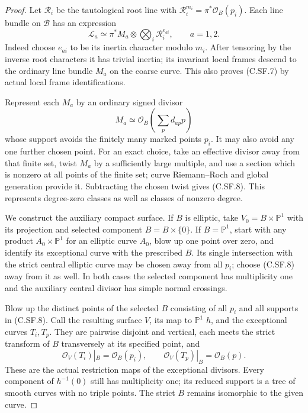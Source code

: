 \begin{proof}
Let $\mathcal R_i$ be the tautological
root line with
$\mathcal R_i^{m_i}=\pi^*\mathcal O_B(p_i)$.
Each line bundle on $\mathcal B$ has
an expression
\[
 \mathcal L_a\simeq\pi^*M_a\otimes
                  \bigotimes_i\mathcal R_i^{e_{ai}},
                  \qquad a=1,2.
                                                               \tag{C.SF.7}
\]
Indeed choose $e_{ai}$ to be its
inertia character modulo $m_i$.
After tensoring by the inverse root
characters it has trivial inertia;
its invariant local frames descend
to the ordinary line bundle $M_a$
on the coarse curve. This also
proves (C.SF.7) by actual local
frame identifications.

Represent each $M_a$ by an ordinary
signed divisor
\[
                        M_a\simeq\mathcal O_B\left(
                                    \sum_p d_{ap}p\right)
                                                               \tag{C.SF.8}
\]
whose support avoids the finitely
many marked points $p_i$. It may
also avoid any one further chosen
point. For an exact choice, take
an effective divisor away from
that finite set, twist $M_a$ by
a sufficiently large multiple,
and use a section which is nonzero
at all points of the finite set;
curve Riemann--Roch and global
generation provide it. Subtracting
the chosen twist gives (C.SF.8).
This represents degree-zero classes
as well as classes of nonzero
degree.

We construct the auxiliary compact
surface. If $B$ is elliptic, take
$V_0=B\times\mathbb P^1$ with its
projection and selected component
$B=B\times\{0\}$. If $B=\mathbb P^1$,
start with any product
$A_0\times\mathbb P^1$ for an
elliptic curve $A_0$, blow up one
point over zero, and identify its
exceptional curve with the prescribed
$B$. Its single intersection with
the strict central elliptic curve
may be chosen away from all $p_i$;
choose (C.SF.8) away from it as well.
In both cases the selected component
has multiplicity one and the
auxiliary central divisor has
simple normal crossings.

Blow up the distinct points of
the selected $B$ consisting of
all $p_i$ and all supports in
(C.SF.8). Call the resulting
surface $V$, its map to
$\mathbb P^1$ $h$, and the
exceptional curves $T_i,T_p$.
They are pairwise disjoint and
vertical, each meets the strict
transform of $B$ transversely
at its specified point, and
\[
 \mathcal O_V(T_i)|_B=\mathcal O_B(p_i),
 \qquad\mathcal O_V(T_p)|_B=\mathcal O_B(p).
                                                               \tag{C.SF.9}
\]
These are the actual restriction
maps of the exceptional divisors.
Every component of $h^{-1}(0)$
still has multiplicity one; its
reduced support is a tree of
smooth curves with no triple
points. The strict $B$ remains
isomorphic to the given curve.


\end{proof}
